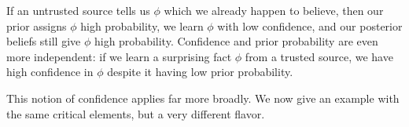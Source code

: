 \begin{example}
If an untrusted source tells us $\phi$ which we already happen to believe, 
then our prior assigns $\phi$ high probability,
we learn $\phi$ with low confidence,
and our posterior beliefs still give $\phi$ high probability.  
Confidence and prior probability are even more independent: 
if we learn a surprising fact $\phi$ from a trusted source, we have high confidence in $\phi$ despite it having low prior probability.
\end{example}


This notion of confidence applies far more broadly.
We now give an example with the same critical elements,
but a very different flavor.


